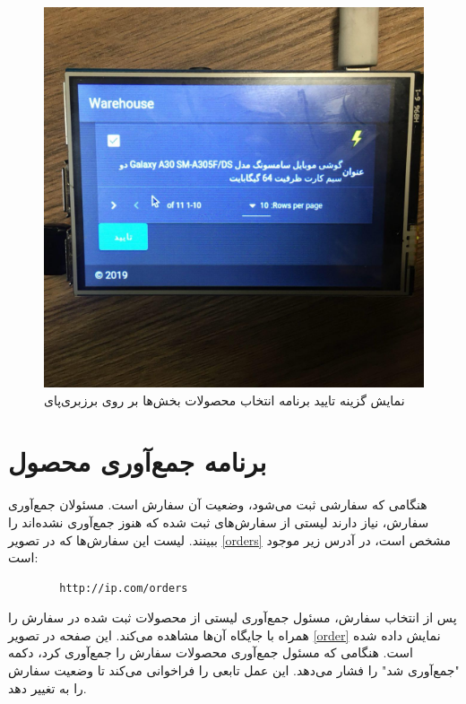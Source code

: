 \begin{figure}[t!]
    \centering
    \includegraphics[scale=0.25]{figures/implement2.jpg}
    \caption{نمایش  گزینه تایید برنامه انتخاب محصولات بخش‌ها بر روی برزبری‌پای}
    \label{implement2}
\end{figure}

\section{برنامه جمع‌آوری محصول}
هنگامی که سفارشی ثبت می‌شود، وضعیت آن سفارش  است. مسئولان جمع‌آوری سفارش، نیاز دارند لیستی از سفارش‌های ثبت
شده که هنوز جمع‌آوری نشده‌اند را ببینند. لیست این سفارش‌ها که در تصویر \ref{orders} مشخص است، در آدرس زیر موجود است:
\begin{latin}
    \begin{lstlisting}
        http://ip.com/orders
    \end{lstlisting}
\end{latin}
پس از انتخاب سفارش، مسئول جمع‌آوری لیستی از محصولات ثبت شده در سفارش را همراه با جایگاه آن‌ها مشاهده می‌کند. این صفحه در تصویر \ref{order} نمایش داده شده است.
هنگامی که مسئول جمع‌آوری محصولات سفارش را جمع‌آوری کرد، دکمه "جمع‌آوری شد" را فشار می‌دهد. این عمل تابعی را فراخوانی می‌کند
تا وضعیت سفارش را به  تغییر دهد.



